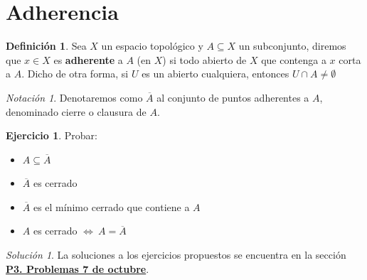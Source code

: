 \documentclass[12pt,twoside]{report}
\theoremstyle{azul}
\theoremstyle{azul2}
\theoremstyle{plain}
\theoremstyle{definition}
\newtheorem*{defi}{Definición}
\newtheorem*{ejer}{Ejercicio}
\theoremstyle{remark}
\newtheorem*{sol}{Solución}
\newtheorem*{nota}{Notación}
\begin{document}
\section{Adherencia} \label{sec:adherencia} 
\begin{defi}
Sea $X$ un espacio topológico y $A\subseteq X$ un subconjunto, diremos que $x \in X$ es \textbf{adherente} a $A$ (en $X$) si todo abierto de $X$ que contenga a $x$ corta a $A$.
Dicho de otra forma, si $U$ es un abierto cualquiera, entonces $U \cap A \neq \emptyset$ 
\begin{nota}
Denotaremos como $\overline{A}$ al conjunto de puntos adherentes a $A$, denominado cierre o clausura de $A$.
\end{nota}
\end{defi}
\begin{ejer} Probar: \vspace{-5mm}
\begin{itemize}
    \item $A \subseteq \overline{A}$
    \item $\overline{A}$ es cerrado
    \item $\overline{A}$ es el mínimo cerrado que contiene a $A$
    \item $A$ es cerrado $\Leftrightarrow \: A = \overline{A}$
\end{itemize}
\end{ejer}
\begin{sol}
La soluciones a los ejercicios propuestos se encuentra en la sección \textbf{\textcolor{blue}{\hyperref[P3]{P3. Problemas 7 de octubre}}}.
\end{sol}
\end{document}
